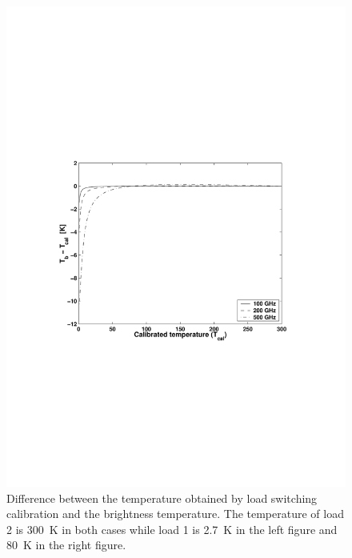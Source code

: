 \begin{figure}[t]
\begin{center}
\begin{minipage}{0.50\textwidth}
   \end{minipage}%
   \begin{minipage}{0.50\textwidth}
    \centering
    \includegraphics*[width=0.99\hsize]{Figs/fig_calerror_tb_2}
   \end{minipage}
  \end{center}
    \caption{Difference between the temperature obtained by load switching 
             calibration and the brightness temperature. The temperature of
             load 2 is 300~K in both cases while load 1 is 2.7~K in the
             left figure and 80~K in the right figure.}
    \label{fig:sensor:loadswitch1}
 \end{figure}           
